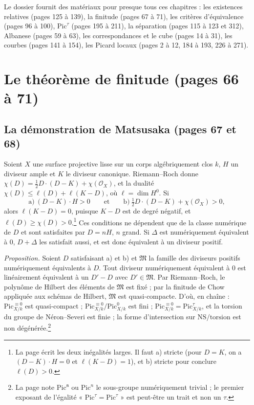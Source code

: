 \documentclass[11pt,a4paper]{article}
\begin{document}
Le dossier fournit des matériaux pour presque tous ces chapitres : les
existences relatives (pages 125 à 139), la finitude (pages 67 à 71), les
critères d'équivalence (pages 96 à 100), $\mathrm{Pic}^\tau$ (pages 195 à 211),
la séparation (pages 115 à 123 et 312), Albanese (pages 59 à 63), les
correspondances et le cube (pages 14 à 31), les courbes (pages 141 à 154), les
Picard locaux (pages 2 à 12, 184 à 193, 226 à 271).

\section*{Le théorème de finitude (pages 66 à 71)}

\subsection*{La démonstration de Matsusaka (pages 67 et 68)}

Soient $X$ une surface projective lisse sur un corps algébriquement clos $k$,
$H$ un diviseur ample et $K$ le diviseur canonique. Riemann--Roch donne
$\chi(D) = \frac12 D\cdot(D - K) + \chi(\mathcal{O}_X)$, et la dualité
$\chi(D) \leq \ell(D) + \ell(K - D)$, où $\ell = \dim H^0$. Si
\[
\text{a)}\ (D - K)\cdot H > 0 \qquad \text{et} \qquad
\text{b)}\ \tfrac12 D\cdot(D - K) + \chi(\mathcal{O}_X) > 0 ,
\]
alors $\ell(K - D) = 0$, puisque $K - D$ est de degré négatif, et
$\ell(D) \geq \chi(D) > 0$.\footnote{La page écrit les deux inégalités larges.
Il faut a) stricte (pour $D = K$, on a $(D - K)\cdot H = 0$ et
$\ell(K - D) = 1$), et b) stricte pour conclure $\ell(D) > 0$.} Ces
conditions ne dépendent que de la classe numérique de $D$ et sont satisfaites
par $D = nH$, $n$ grand. Si $\Delta$ est numériquement équivalent à $0$,
$D + \Delta$ les satisfait aussi, et est donc équivalent à un diviseur positif.

\emph{Proposition.} Soient $D$ satisfaisant a) et b) et $\mathfrak{M}$ la
famille des diviseurs positifs numériquement équivalents à $D$. Tout diviseur
numériquement équivalent à $0$ est linéairement équivalent à un $D' - D$ avec
$D' \in \mathfrak{M}$. Par Riemann--Roch, le polynôme de Hilbert des éléments
de $\mathfrak{M}$ est fixé ; par la finitude de Chow appliquée aux schémas de
Hilbert, $\mathfrak{M}$ est quasi-compacte. D'où, en chaîne :
$\mathrm{Pic}^{\equiv 0}_{X/k}$ est quasi-compact ;
$\mathrm{Pic}^{\equiv 0}_{X/k}/\mathrm{Pic}^0_{X/k}$ est fini ;
$\mathrm{Pic}^{\equiv 0}_{X/k} = \mathrm{Pic}^\tau_{X/k}$, et la torsion du
groupe de Néron--Severi est finie ; la forme d'intersection sur
$\mathrm{NS}/\text{torsion}$ est non dégénérée.\footnote{La page note
$\mathrm{Pic}^{\mathfrak{n}}$ ou $\mathrm{Pic}^n$ le sous-groupe
numériquement trivial ; le premier exposant de l'égalité
« $\mathrm{Pic}^{\tau} = \mathrm{Pic}^{\tau}$ » est peut-être un trait et non
un $\tau$.}
\end{document}
